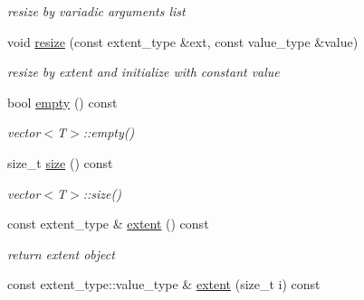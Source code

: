 \begin{DoxyCompactItemize}
\begin{DoxyCompactList}\small\item\em resize by variadic arguments list \item\end{DoxyCompactList}\item 
\hypertarget{classbtas_1_1_tensor_aa3e3e24a23f4821eb986d76c0963b2fe}{
void \hyperlink{classbtas_1_1_tensor_aa3e3e24a23f4821eb986d76c0963b2fe}{resize} (const extent\_\-type \&ext, const value\_\-type \&value)}
\label{classbtas_1_1_tensor_aa3e3e24a23f4821eb986d76c0963b2fe}

\begin{DoxyCompactList}\small\item\em resize by extent and initialize with constant value \item\end{DoxyCompactList}\item 
\hypertarget{classbtas_1_1_tensor_ae71081875506bf4b50c802b3f27f9362}{
bool \hyperlink{classbtas_1_1_tensor_ae71081875506bf4b50c802b3f27f9362}{empty} () const }
\label{classbtas_1_1_tensor_ae71081875506bf4b50c802b3f27f9362}

\begin{DoxyCompactList}\small\item\em vector$<$T$>$::empty() \item\end{DoxyCompactList}\item 
\hypertarget{classbtas_1_1_tensor_af6a335f589a0e9f777ddc63127b92405}{
size\_\-t \hyperlink{classbtas_1_1_tensor_af6a335f589a0e9f777ddc63127b92405}{size} () const }
\label{classbtas_1_1_tensor_af6a335f589a0e9f777ddc63127b92405}

\begin{DoxyCompactList}\small\item\em vector$<$T$>$::size() \item\end{DoxyCompactList}\item 
\hypertarget{classbtas_1_1_tensor_a112b037bcb8f37cea861aa080c153343}{
const extent\_\-type \& \hyperlink{classbtas_1_1_tensor_a112b037bcb8f37cea861aa080c153343}{extent} () const }
\label{classbtas_1_1_tensor_a112b037bcb8f37cea861aa080c153343}

\begin{DoxyCompactList}\small\item\em return extent object \item\end{DoxyCompactList}\item 
\hypertarget{classbtas_1_1_tensor_a639fcef0df02c70d34d91d65e4b4e9b4}{
const extent\_\-type::value\_\-type \& \hyperlink{classbtas_1_1_tensor_a639fcef0df02c70d34d91d65e4b4e9b4}{extent} (size\_\-t i) const }
\label{classbtas_1_1_tensor_a639fcef0df02c70d34d91d65e4b4e9b4}


\end{DoxyCompactItemize}
